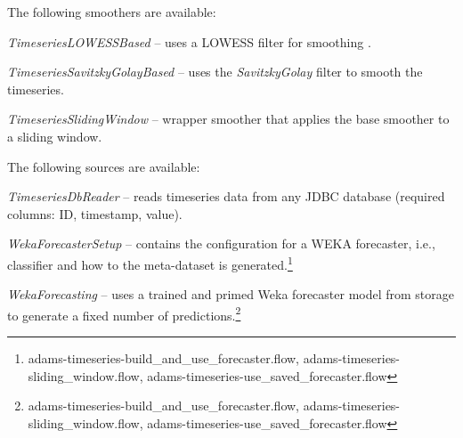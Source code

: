 \documentclass[a4paper]{book}
\begin{document}
\noindent The following smoothers are available:
\begin{tight_itemize}
	\item \textit{TimeseriesLOWESSBased} -- uses a LOWESS filter for smoothing \cite{lowess}.
	\item \textit{TimeseriesSavitzkyGolayBased} -- uses the \textit{SavitzkyGolay} filter
	to smooth the timeseries.\cite{savitzky}
	\item \textit{TimeseriesSlidingWindow} -- wrapper smoother that applies the base
	smoother to a sliding window.
\end{tight_itemize}

\noindent The following sources are available:
\begin{tight_itemize}
	\item \textit{TimeseriesDbReader} -- reads timeseries data from any
	JDBC database (required columns: ID, timestamp, value).
	\item \textit{WekaForecasterSetup} -- contains the configuration for a
	WEKA forecaster, i.e., classifier and how to the meta-dataset is 
	generated.\footnote{adams-timeseries-build\_and\_use\_forecaster.flow, adams-timeseries-sliding\_window.flow, adams-timeseries-use\_saved\_forecaster.flow}
	\item \textit{WekaForecasting} -- uses a trained and primed Weka forecaster
	model from storage to generate a fixed number of 
	predictions.\footnote{adams-timeseries-build\_and\_use\_forecaster.flow, adams-timeseries-sliding\_window.flow, adams-timeseries-use\_saved\_forecaster.flow}
\end{tight_itemize}
\end{document}

